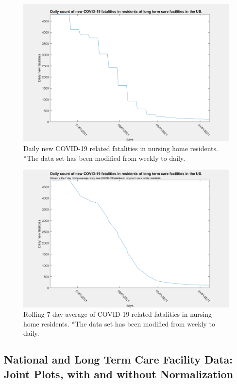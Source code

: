 \documentclass[twoside]{article}
\begin{document}
\begin{multicols}{2}
\begin{figure}[H]
	\includegraphics[width=\linewidth]{images/usa_daily_ltc_fatalities_unprocessed.png}
	\caption{Daily new COVID-19 related fatalities in nursing home residents. *The data set has been modified from weekly to daily.}
	\label{fig:images/usa_daily_ltc_fatalities_unprocessedLabel}
\end{figure}

\begin{figure}[H]
	\includegraphics[width=\linewidth]{images/usa_daily_ltc_fatalities_processed.png}
	\caption{Rolling 7 day average of COVID-19 related fatalities in nursing home residents. *The data set has been modified from weekly to daily.}
	\label{fig:images/usa_daily_ltc_fatalities_processedLabel}
\end{figure}

\subsection{National and Long Term Care Facility Data: Joint Plots, with and without Normalization}



\end{multicols}
\end{document}
